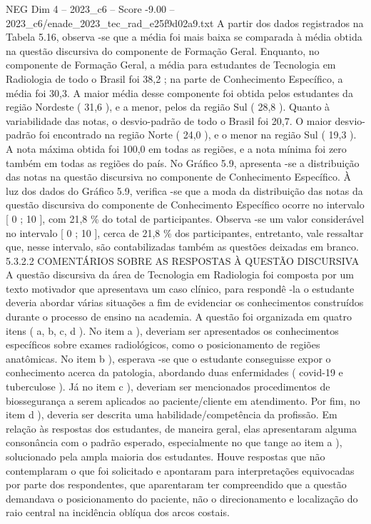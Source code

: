 \begin{textsample}{NEG Dim 4 – 2023\_c6 – Score -9.00 – 2023\_c6/enade\_2023\_tec\_rad\_e25f9d02a9.txt}
A partir dos dados registrados na Tabela 5.16, observa -se que a média foi mais baixa se comparada à média obtida na questão discursiva do componente de Formação Geral.
Enquanto, no componente de Formação Geral, a média para estudantes de Tecnologia em Radiologia de todo o Brasil foi 38,2 ; na parte de Conhecimento Específico, a média foi 30,3.
A maior média desse componente foi obtida pelos estudantes da região Nordeste ( 31,6 ), e a menor, pelos da região Sul ( 28,8 ).
Quanto à variabilidade das notas, o desvio-padrão de todo o Brasil foi 20,7.
O maior desvio-padrão foi encontrado na região Norte ( 24,0 ), e o menor na região Sul ( 19,3 ).
A nota máxima obtida foi 100,0 em todas as regiões, e a nota mínima foi zero também em todas as regiões do país.
No Gráfico 5.9, apresenta -se a distribuição das notas na questão discursiva no componente de Conhecimento Específico.
À luz dos dados do Gráfico 5.9, verifica -se que a moda da distribuição das notas da questão discursiva do componente de Conhecimento Específico ocorre no intervalo [ 0 ; 10 ], com 21,8 \% do total de participantes.
Observa -se um valor considerável no intervalo [ 0 ; 10 ], cerca de 21,8 \% dos participantes, entretanto, vale ressaltar que, nesse intervalo, são contabilizadas também as questões deixadas em branco. 5.3.2.2 COMENTÁRIOS SOBRE AS RESPOSTAS À QUESTÃO DISCURSIVA A questão discursiva da área de Tecnologia em Radiologia foi composta por um texto motivador que apresentava um caso clínico, para respondê -la o estudante deveria abordar várias situações a fim de evidenciar os conhecimentos construídos durante o processo de ensino na academia.
A questão foi organizada em quatro itens ( a, b, c, d ).
No item a ), deveriam ser apresentados os conhecimentos específicos sobre exames radiológicos, como o posicionamento de regiões anatômicas.
No item b ), esperava -se que o estudante conseguisse expor o conhecimento acerca da patologia, abordando duas enfermidades ( covid-19 e tuberculose ).
Já no item c ), deveriam ser mencionados procedimentos de biossegurança a serem aplicados ao paciente/cliente em atendimento.
Por fim, no item d ), deveria ser descrita uma habilidade/competência da profissão.
Em relação às respostas dos estudantes, de maneira geral, elas apresentaram alguma consonância com o padrão esperado, especialmente no que tange ao item a ), solucionado pela ampla maioria dos estudantes.
Houve respostas que não contemplaram o que foi solicitado e apontaram para interpretações equivocadas por parte dos respondentes, que aparentaram ter compreendido que a questão demandava o posicionamento do paciente, não o direcionamento e localização do raio central na incidência oblíqua dos arcos costais.

\end{textsample}
